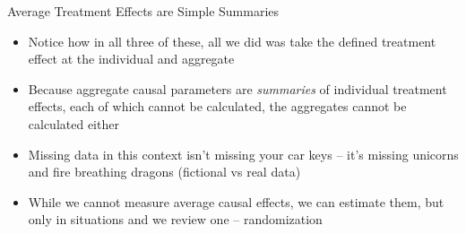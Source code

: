 \documentclass{beamer}
\begin{document}
\begin{frame}{Average Treatment Effects are Simple Summaries}

  \begin{itemize}
	\item Notice how in all three of these, all we did was take the defined treatment effect at the individual and aggregate
	\item Because aggregate causal parameters are \emph{summaries} of individual treatment effects, each of which cannot be calculated, the aggregates cannot be calculated either
	\item Missing data in this context isn't missing your car keys -- it's missing unicorns and fire breathing dragons (fictional vs real data)
	\item While we cannot measure average causal effects, we can estimate them, but only in situations and we review one -- randomization
  \end{itemize}

\end{frame}







\end{document}
